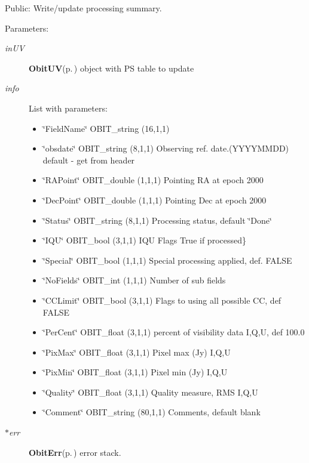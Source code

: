 Public: Write/update processing summary. 

\begin{Desc}
\item[Parameters:]
\begin{description}
\item[{\em in\-UV}]{\bf Obit\-UV}{\rm (p.\,\pageref{structObitUV})} object with PS table to update \item[{\em info}]List with parameters: \begin{itemize}
\item \char`\"{}Field\-Name\char`\"{} OBIT\_\-string (16,1,1) \item \char`\"{}obsdate\char`\"{} OBIT\_\-string (8,1,1) Observing ref. date.(YYYYMMDD) default - get from header \item \char`\"{}RAPoint\char`\"{} OBIT\_\-double (1,1,1) Pointing RA at epoch 2000 \item \char`\"{}Dec\-Point\char`\"{} OBIT\_\-double (1,1,1) Pointing Dec at epoch 2000 \item \char`\"{}Status\char`\"{} OBIT\_\-string (8,1,1) Processing status, default \char`\"{}Done\char`\"{} \item \char`\"{}IQU\char`\"{} OBIT\_\-bool (3,1,1) IQU Flags True if processed\} \item \char`\"{}Special\char`\"{} OBIT\_\-bool (1,1,1) Special processing applied, def. FALSE \item \char`\"{}No\-Fields\char`\"{} OBIT\_\-int (1,1,1) Number of sub fields \item \char`\"{}CCLimit\char`\"{} OBIT\_\-bool (3,1,1) Flags to using all possible CC, def FALSE \item \char`\"{}Per\-Cent\char`\"{} OBIT\_\-float (3,1,1) percent of visibility data I,Q,U, def 100.0 \item \char`\"{}Pix\-Max\char`\"{} OBIT\_\-float (3,1,1) Pixel max (Jy) I,Q,U \item \char`\"{}Pix\-Min\char`\"{} OBIT\_\-float (3,1,1) Pixel min (Jy) I,Q,U \item \char`\"{}Quality\char`\"{} OBIT\_\-float (3,1,1) Quality measure, RMS I,Q,U \item \char`\"{}Comment\char`\"{} OBIT\_\-string (80,1,1) Comments, default blank \end{itemize}
\item[{\em $\ast$err}]{\bf Obit\-Err}{\rm (p.\,\pageref{structObitErr})} error stack. \end{description}
\end{Desc}
